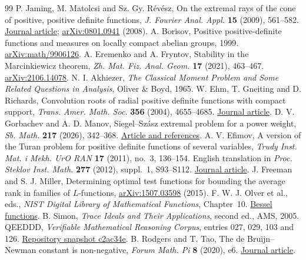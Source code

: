 \documentclass[11pt,a4paper]{article}
\numberwithin{equation}{section}
\begin{document}
\begin{thebibliography}{99}
 P. Jaming, M. Matolcsi and Sz. Gy. R\'ev\'esz, On the extremal rays of the cone of positive, positive definite functions, \emph{J. Fourier Anal. Appl.} \textbf{15} (2009), 561--582. \href{https://doi.org/10.1007/s00041-008-9057-6}{Journal article}; \href{https://arxiv.org/abs/0801.0941}{arXiv:0801.0941} (2008).
 A. Borisov, Positive positive-definite functions and measures on locally compact abelian groups, 1999. \href{https://arxiv.org/abs/math/9906126}{arXiv:math/9906126}.
 A. Eremenko and A. Fryntov, Stability in the Marcinkiewicz theorem, \emph{Zh. Mat. Fiz. Anal. Geom.} \textbf{17} (2021), 463--467. \href{https://arxiv.org/abs/2106.14078}{arXiv:2106.14078}.
 N. I. Akhiezer, \emph{The Classical Moment Problem and Some Related Questions in Analysis}, Oliver \& Boyd, 1965.
 W. Ehm, T. Gneiting and D. Richards, Convolution roots of radial positive definite functions with compact support, \emph{Trans. Amer. Math. Soc.} \textbf{356} (2004), 4655--4685. \href{https://doi.org/10.1090/S0002-9947-04-03502-0}{Journal article}.
 D. V. Gorbachev and A. D. Manov, Siegel--Sz\'asz extremal problem for a power weight, \emph{Sb. Math.} \textbf{217} (2026), 342--368. \href{https://www.mathnet.ru/eng/sm10268}{Article and references}.
 A. V. Efimov, A version of the Turan problem for positive definite functions of several variables, \emph{Trudy Inst. Mat. i Mekh. UrO RAN} \textbf{17} (2011), no.~3, 136--154. English translation in \emph{Proc. Steklov Inst. Math.} \textbf{277} (2012), suppl.~1, S93--S112. \href{https://doi.org/10.1134/S0081543812050100}{Journal article}.
 J. Freeman and S. J. Miller, Determining optimal test functions for bounding the average rank in families of $L$-functions, \href{https://arxiv.org/abs/1507.03598}{arXiv:1507.03598} (2015).
 F. W. J. Olver et al., eds., \emph{NIST Digital Library of Mathematical Functions}, Chapter~10. \href{https://dlmf.nist.gov/10}{Bessel functions}.
 B. Simon, \emph{Trace Ideals and Their Applications}, second ed., AMS, 2005.
 QEEDDD, \emph{Verifiable Mathematical Reasoning Corpus}, entries 027, 029, 103 and 126. \href{https://github.com/QEEDDD/Verifiable-Mathematical-Reasoning-Corpus/tree/c2ac34ea4622778187173f41bb1996deee8081b7}{Repository snapshot c2ac34e}.
 B. Rodgers and T. Tao, The de Bruijn--Newman constant is non-negative, \emph{Forum Math. Pi} \textbf{8} (2020), e6. \href{https://doi.org/10.1017/fmp.2020.6}{Journal article}.

\end{thebibliography}
\end{document}

